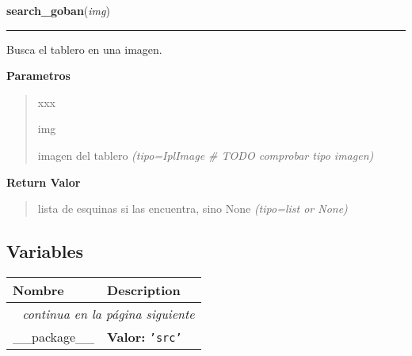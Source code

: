 \hspace{.8\funcindent}\begin{boxedminipage}{\funcwidth}

    \raggedright \textbf{search\_goban}(\textit{img})

    \vspace{-1.5ex}

    \rule{\textwidth}{0.5\fboxrule}
\setlength{\parskip}{2ex}
Busca el tablero en una imagen.

\setlength{\parskip}{1ex}
      \textbf{Parametros}
      \vspace{-1ex}

      \begin{quote}
        \begin{Ventry}{xxx}

          \item[img]


imagen del tablero
            {\it (tipo=IplImage \# TODO comprobar tipo imagen)}

        \end{Ventry}

      \end{quote}

      \textbf{Return Valor}
    \vspace{-1ex}

      \begin{quote}

lista de esquinas si las encuentra, sino None
      {\it (tipo=list or None)}

      \end{quote}

    \end{boxedminipage}



  \subsection{Variables}

    \vspace{-1cm}
\hspace{\varindent}\begin{longtable}{|p{\varnamewidth}|p{\vardescrwidth}|l}
\cline{1-2}
\cline{1-2} \centering \textbf{Nombre} & \centering \textbf{Description}& \\
\cline{1-2}
\endhead\cline{1-2}\multicolumn{3}{r}{\small\textit{continua en la página siguiente}}\\\endfoot\cline{1-2}
\endlastfoot\raggedright \_\-\_\-p\-a\-c\-k\-a\-g\-e\-\_\-\_\- & \raggedright \textbf{Valor:} 
{\tt \texttt{'}\texttt{src}\texttt{'}}&\\
\cline{1-2}
\end{longtable}

